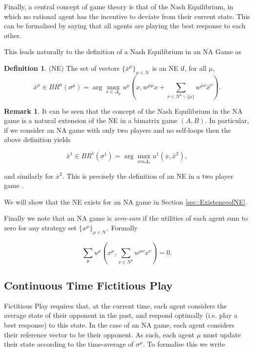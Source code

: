 \documentclass{article}
\theoremstyle{definition}
\newtheorem{definition}{Definition}
\newtheorem*{remark}{Remark}
\newcommand{\agentset}{\mathcal{N}}
\newcommand{\wmunu}{w^{\mu \nu}}
\newcommand{\xmu}{x^{\mu}}
\newcommand{\xnu}{x^{\nu}}
\newcommand{\refmu}{\sigma^{\mu}}
\newcommand{\NE}[1]{\bar{x}^{#1}}
\newcommand{\weightedsum}{ \sum_{\nu \in N^\mu} \wmunu \xnu}
\begin{document}
  Finally, a central concept of game theory is that of the Nash Equilibrium, in which no rational
  agent has the incentive to deviate from their current state. This can be formalised by saying
  that all agents are playing the best response to each other.

  This leads naturally to the definition of a Nash Equilibrium in an NA Game as

  \begin{definition}(NE) \label{def::NE}
    The set of vectors $\{ \NE{\mu}\}_{\mu \in \agentset}$ is an NE if, for all $\mu$,  
    \begin{equation*}
    \NE{\mu} \in BR^\mu (\refmu) = \arg \max_{x \in \Delta_\mu} u^\mu(x, w^{\mu \mu} x + \sum_{\nu \in N^\mu \backslash \{\bar{\mu}\}} \wmunu \NE{\nu}).
    \end{equation*} 
  \end{definition}
    
  \begin{remark}
    It can be seen that the concept of the Nash Equilibrium in the NA game is a natural
    extension of the NE in a bimatrix game $(A, B)$. In particular, if we consider an NA game
    with only two players and no self-loops then the above definition yields

    \begin{equation*}
      \NE{1} \in BR^1 (\sigma^1) = \arg \max_{x in \Delta_1} u^1 (x, \NE{2}), 
    \end{equation*}

    and similarly for $\NE{2}$. This is precisely the definition of an NE in a two player game \cite{}.
  \end{remark}

  We will show that the NE exists for an NA game in Section \ref{sec::ExistenceofNE}. 

  Finally we note that an NA game is \emph{zero-sum} if the utilities of each agent sum to zero for any strategy set $\{ \xmu \}_{\mu \in \agentset}$. Formally

  \begin{equation}
    \sum_\mu u^\mu(\xmu, \weightedsum) = 0.
  \end{equation}

\subsection{Continuous Time Fictitious Play}
\label{sec::CTFP}

  Fictitious Play requires that, at the current time, each agent considers the average state
  of their opponent in the past, and respond optimally (i.e. play a best response) to this state. In the case of an NA game, each agent considers their reference vector to be their
  opponent. As such, each agent $\mu$ must update their state according to the time-average of
  $\refmu$. To formalise this we write
\end{document}

